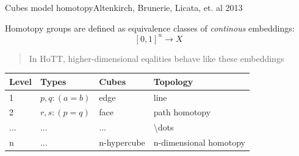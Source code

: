 \documentclass[english, draft]{beamer}
\begin{document}
\begin{frame}{Cubes model homotopy}{Altenkirch, Brunerie, Licata, et. al 2013}
 
Homotopy groups are defined as equivalence classes of \emph{continous} embeddings:
$$[0,1]^n \rightarrow X$$

\begin{quotation}
In HoTT, higher-dimensional eqalities behave like these embeddings
\end{quotation}
\pause

    \begin{table}[]
        \begin{tabular}{@{}llll@{}}
        \toprule
        Level                & Types                & Cubes                 & Topology               \\ \midrule
        1                    & $p,q : (a = b)$        & edge                  & line                   \\
        2                    & $r,s : (p = q)$        & face                  & path homotopy          \\
        ... & ... & ... & \textbackslash{}dots   \\
        n                    & ... & n-hypercube           & n-dimensional homotopy \\ \bottomrule
        \end{tabular}
    \end{table}

%  
\end{frame}
\end{document}
